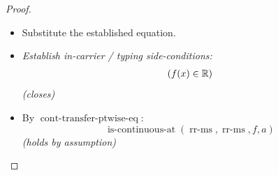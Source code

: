\documentclass[11pt]{article}
\theoremstyle{plain}
\begin{document}
\begin{proof}
\begin{itemize}[leftmargin=2.8em, itemsep=4pt, parsep=1pt]
  \item[\textbf{23}] Substitute the established equation.
  \item[\textbf{24--25}] \emph{Establish in-carrier / typing side-conditions:}
\begin{equation*}
\begin{array}{@{}l@{}}
(f(x) \in \mathbb{R})
\end{array}
\end{equation*}
  \emph{(closes)}
  \item[\textbf{26--27}] By $\operatorname{cont\text{-}transfer\text{-}ptwise\text{-}eq}$:
\begin{equation*}
\operatorname{is\text{-}continuous\text{-}at}(\operatorname{rr\text{-}ms}, \operatorname{rr\text{-}ms}, f, a)
\end{equation*}
  \emph{(holds by assumption)}
\end{itemize}
\end{proof}
\end{document}

